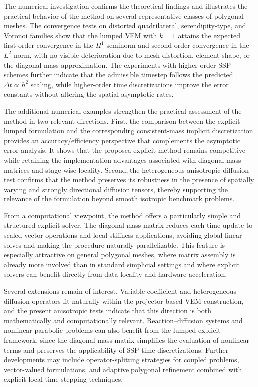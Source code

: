 \documentclass{article}
\begin{document}
The numerical investigation confirms the theoretical findings and illustrates the practical behavior of the method on several representative classes of polygonal meshes. The convergence tests on distorted quadrilateral, serendipity-type, and Voronoi families show that the lumped VEM with $k=1$ attains the expected first-order convergence in the $H^1$-seminorm and second-order convergence in the $L^2$-norm, with no visible deterioration due to mesh distortion, element shape, or the diagonal mass approximation. The experiments with higher-order SSP schemes further indicate that the admissible timestep follows the predicted $\Delta t \propto h^2$ scaling, while higher-order time discretizations improve the error constants without altering the spatial asymptotic rates.

The additional numerical examples strengthen the practical assessment of the method in two relevant directions. First, the comparison between the explicit lumped formulation and the corresponding consistent-mass implicit discretization provides an accuracy/efficiency perspective that complements the asymptotic error analysis. It shows that the proposed explicit method remains competitive while retaining the implementation advantages associated with diagonal mass matrices and stage-wise locality. Second, the heterogeneous anisotropic diffusion test confirms that the method preserves its robustness in the presence of spatially varying and strongly directional diffusion tensors, thereby supporting the relevance of the formulation beyond smooth isotropic benchmark problems.

From a computational viewpoint, the method offers a particularly simple and structured explicit solver. The diagonal mass matrix reduces each time update to scaled vector operations and local stiffness applications, avoiding global linear solves and making the procedure naturally parallelizable. This feature is especially attractive on general polygonal meshes, where matrix assembly is already more involved than in standard simplicial settings and where explicit solvers can benefit directly from data locality and hardware acceleration.

Several extensions remain of interest. Variable-coefficient and heterogeneous diffusion operators fit naturally within the projector-based VEM construction, and the present anisotropic tests indicate that this direction is both mathematically and computationally relevant. Reaction--diffusion systems and nonlinear parabolic problems can also benefit from the lumped explicit framework, since the diagonal mass matrix simplifies the evaluation of nonlinear terms and preserves the applicability of SSP time discretizations. Further developments may include operator-splitting strategies for coupled problems, vector-valued formulations, and adaptive polygonal refinement combined with explicit local time-stepping techniques.
\end{document}

